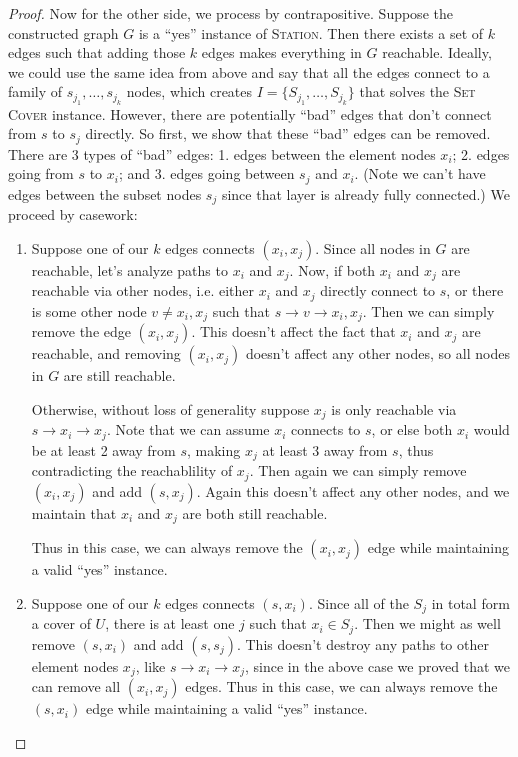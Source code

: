 \documentclass[10pt]{article}
\begin{document}
\begin{proof}
  Now for the other side, we process by contrapositive. Suppose the constructed graph \(G\) is a ``yes'' instance of \textsc{Station}. Then there exists a set of \(k\) edges such that adding those \(k\) edges makes everything in \(G\) reachable. Ideally, we could use the same idea from above and say that all the edges connect to a family of \(s_{j_1}, \ldots, s_{j_k}\) nodes, which creates \(I = \{S_{j_1}, \ldots, S_{j_k}\}\) that solves the \textsc{Set Cover} instance. However, there are potentially ``bad'' edges that don't connect from \(s\) to \(s_j\) directly. So first, we show that these ``bad'' edges can be removed. There are 3 types of ``bad'' edges: 1. edges between the element nodes \(x_i\); 2. edges going from \(s\) to \(x_i\); and 3. edges going between \(s_j\) and \(x_i\). (Note we can't have edges between the subset nodes \(s_j\) since that layer is already fully connected.) We proceed by casework:
  \begin{enumerate}
    \item Suppose one of our \(k\) edges connects \((x_i, x_j)\). Since all nodes in \(G\) are reachable, let's analyze paths to \(x_i\) and \(x_j\). Now, if both \(x_i\) and \(x_j\) are reachable via other nodes, i.e. either \(x_i\) and \(x_j\) directly connect to \(s\), or there is some other node \(v \neq x_i, x_j\) such that \(s \to v \to x_i, x_j\). Then we can simply remove the edge \((x_i, x_j)\). This doesn't affect the fact that \(x_i\) and \(x_j\) are reachable, and removing \((x_i, x_j)\) doesn't affect any other nodes, so all nodes in \(G\) are still reachable.
    
    Otherwise, without loss of generality suppose \(x_j\) is only reachable via \(s \to x_i \to x_j\). Note that we can assume \(x_i\) connects to \(s\), or else both \(x_i\) would be at least 2 away from \(s\), making \(x_j\) at least 3 away from \(s\), thus contradicting the reachablility of \(x_j\). Then again we can simply remove \((x_i, x_j)\) and add \((s, x_j)\). Again this doesn't affect any other nodes, and we maintain that \(x_i\) and \(x_j\) are both still reachable. 

    Thus in this case, we can always remove the \((x_i, x_j)\) edge while maintaining a valid ``yes'' instance.

    \item Suppose one of our \(k\) edges connects \((s, x_i)\). Since all of the \(S_j\) in total form a cover of \(U\), there is at least one \(j\) such that \(x_i \in S_j\). Then we might as well remove \((s, x_i)\) and add \((s, s_j)\). This doesn't destroy any paths to other element nodes \(x_j\), like \(s \to x_i \to x_j\), since in the above case we proved that we can remove all \((x_i, x_j)\) edges. Thus in this case, we can always remove the \((s, x_i)\) edge while maintaining a valid ``yes'' instance.
    

\end{enumerate}
\end{proof}
\end{document}
